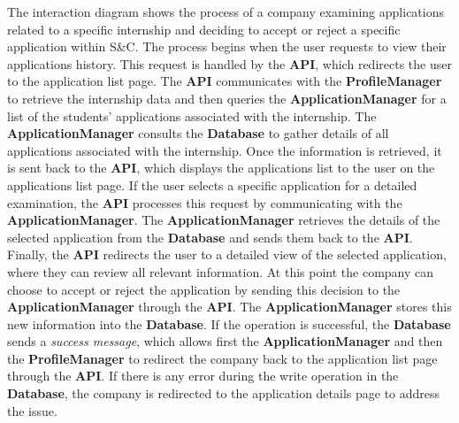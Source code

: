 \begin{enumerate}
    The interaction diagram shows the process of a company examining applications related to a specific internship and deciding to accept or reject a specific application within S\&C. The process begins when the user requests to view their applications history. This request is handled by the \textbf{API}, which redirects the user to the application list page. The \textbf{API} communicates with the \textbf{ProfileManager} to retrieve the internship data and then queries the \textbf{ApplicationManager} for a list of the students’ applications associated with the internship.
    The \textbf{ApplicationManager} consults the \textbf{Database} to gather details of all applications associated with the internship. 
    Once the information is retrieved, it is sent back to the \textbf{API}, which displays the applications list to the user on the applications list page.
    If the user selects a specific application for a detailed examination, the \textbf{API} processes this request by communicating with the \textbf{ApplicationManager}. The \textbf{ApplicationManager} retrieves the details of the selected application from the \textbf{Database} and sends them back to the \textbf{API}. 
    \\Finally, the \textbf{API} redirects the user to a detailed view of the selected application, where they can review all relevant information.
    At this point the company can choose to accept or reject the application by sending this decision to the \textbf{ApplicationManager} through the \textbf{API}. The \textbf{ApplicationManager} stores this new information into the \textbf{Database}. If the operation is successful, the \textbf{Database} sends a \textit{success message}, which allows first the \textbf{ApplicationManager} and then the \textbf{ProfileManager} to redirect the company back to the application list page through the \textbf{API}. 
    If there is any error during the write operation in the \textbf{Database}, the company is redirected to the application details page to address the issue.
    

\end{enumerate}
